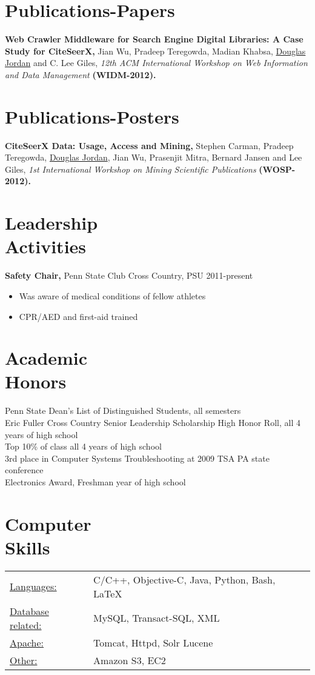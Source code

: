 \documentclass[margin]{res}
\begin{document}
\begin{resume}
\section{Publications-Papers}
{\bf Web Crawler Middleware for Search Engine Digital Libraries: A Case Study for CiteSeerX,} Jian Wu, Pradeep Teregowda, Madian Khabsa, \underline{Douglas Jordan} and C. Lee Giles, \emph{12th ACM International Workshop on Web Information and Data Management} {\bf (WIDM-2012).}

\section{Publications-Posters}
{\bf CiteSeerX Data: Usage, Access and Mining,} Stephen Carman, Pradeep Teregowda, \underline{Douglas Jordan}, Jian Wu, Prasenjit Mitra, Bernard Jansen and Lee Giles, \emph{1st International Workshop on Mining Scientific Publications} {\bf (WOSP-2012).}

\section{Leadership \\ Activities}
{\bf Safety Chair,} Penn State Club Cross Country, PSU \hfill 2011-present
\begin{itemize} \itemsep -2pt
\item Was aware of medical conditions of fellow athletes
\item CPR/AED and first-aid trained
\end{itemize}

\section{Academic \\ Honors} 
Penn State Dean's List of Distinguished Students, all semesters \\
Eric Fuller Cross Country Senior Leadership Scholarship
High Honor Roll, all 4 years of high school \\
Top 10\% of class all 4 years of high school \\
3rd place in Computer Systems Troubleshooting at 2009 TSA PA state conference \\
Electronics Award, Freshman year of high school \\

\section{Computer \\ Skills}
\begin{tabular}{l p{3in}}
\underline{Languages:} & C/C++, Objective-C, Java, Python, Bash, LaTeX \\
\underline{Database related:} & MySQL, Transact-SQL, XML \\
\underline{Apache:} & Tomcat, Httpd, Solr Lucene \\
\underline{Other:} & Amazon S3, EC2
\end{tabular}


\end{resume}
\end{document}
